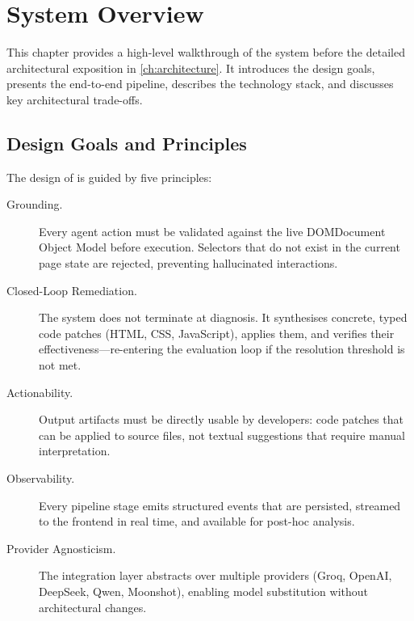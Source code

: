 \chapter{System Overview}
\label{ch:overview}

This chapter provides a high-level walkthrough of the \versimux{} system before the detailed architectural exposition in \cref{ch:architecture}. It introduces the design goals, presents the end-to-end pipeline, describes the technology stack, and discusses key architectural trade-offs.


\section{Design Goals and Principles}
\label{sec:design-goals}

The design of \versimux{} is guided by five principles:

\begin{description}
  \item[Grounding.] Every agent action must be validated against the live \acrfull{DOM}{Document Object Model} before execution. Selectors that do not exist in the current page state are rejected, preventing hallucinated interactions.

  \item[Closed-Loop Remediation.] The system does not terminate at diagnosis. It synthesises concrete, typed code patches (HTML, CSS, JavaScript), applies them, and verifies their effectiveness---re-entering the evaluation loop if the resolution threshold is not met.

  \item[Actionability.] Output artifacts must be directly usable by developers: code patches that can be applied to source files, not textual suggestions that require manual interpretation.

  \item[Observability.] Every pipeline stage emits structured events that are persisted, streamed to the frontend in real time, and available for post-hoc analysis.

  \item[Provider Agnosticism.] The  integration layer abstracts over multiple providers (Groq, OpenAI, DeepSeek, Qwen, Moonshot), enabling model substitution without architectural changes.
\end{description}


